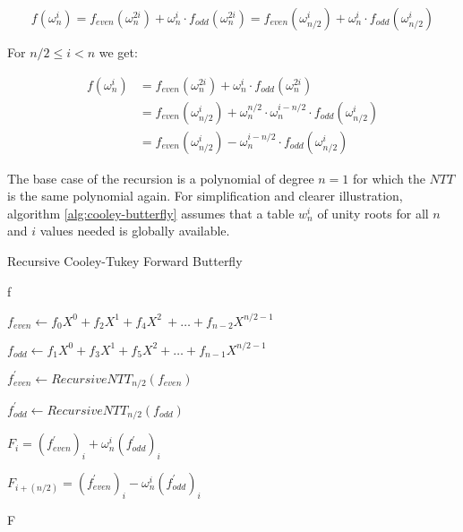\begin{equation*}
    f(\omega_n^i) = f_{even}(\omega_n^{2i}) + \omega_n^i \cdot f_{odd}(\omega_n^{2i}) = f_{even}(\omega_{n/2}^{i}) + \omega_n^i \cdot f_{odd}(\omega_{n/2}^{i}) 
\end{equation*}

For $n/2 \leq i < n$ we get:

\begin{align*}
    f(\omega_n^i) &= f_{even}(\omega_n^{2i}) + \omega_n^i \cdot f_{odd}(\omega_n^{2i}) \\ 
    &= f_{even}(\omega_{n/2}^{i}) + \omega_n^{n/2} \cdot \omega_n^{i - n/2} \cdot f_{odd}(\omega_{n/2}^{i})  \\
    &= f_{even}(\omega_{n/2}^{i}) - \omega_n^{i - n/2} \cdot f_{odd}(\omega_{n/2}^{i}) 
\end{align*}

The base case of the recursion is a polynomial of degree $n=1$ for which the $NTT$ is the same polynomial again.  For simplification and clearer illustration, algorithm \cref{alg:cooley-butterfly} assumes that a table $w_n^i$ of unity roots for all $n$ and $i$ values needed is globally available.

\begin{algorithm}
    \caption{Recursive Cooley-Tukey Forward Butterfly}
    \label{alg:cooley-butterfly}
    \begin{algorithmic}[1]
    


            \Return f
        \EndIf

        \State $f_{even} \leftarrow f_0 X^0 + f_2 X^1 + f_4 X^2\ + \ldots + f_{n-2} X^{n/2-1}$

        \State $f_{odd} \leftarrow f_1 X^0 + f_3 X^1 + f_5 X^2 + \ldots + f_{n-1} X^{n/2-1}$

        \State $f^{'}_{even} \leftarrow RecursiveNTT_{n/2}(f_{even})$

        \State $f^{'}_{odd} \leftarrow RecursiveNTT_{n/2}(f_{odd})$

            \State $F_i = (f^{'}_{even})_i + \omega_n^i (f^{'}_{odd})_i$

            \State $F_{i + (n/2)} = (f^{'}_{even})_i - \omega_n^i (f^{'}_{odd})_i$
        \EndFor

        \Return F
    
    \EndProcedure
    
    \end{algorithmic}
\end{algorithm}

